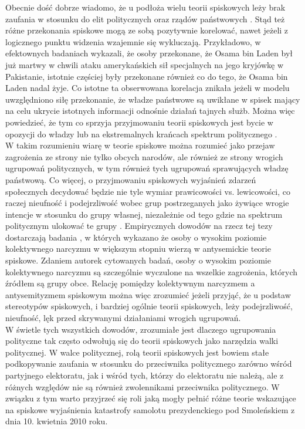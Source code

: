 \documentclass[man]{apa6}
\begin{document}
	Obecnie dość dobrze wiadomo, że u podłoża wielu teorii spiskowych leży brak zaufania w stosunku do elit politycznych oraz rządów państwowych \parencite[zob. przegląd w,][]{van2014power}. Stąd też różne przekonania spiskowe mogą ze sobą pozytywnie korelować, nawet jeżeli z logicznego punktu widzenia wzajemnie się wykluczają. Przykładowo, \textcite{wood2012dead} w efektownych badaniach wykazali, że osoby przekonane, że Osama bin Laden był już martwy w chwili ataku amerykańskich sił specjalnych na jego kryjówkę w Pakistanie, istotnie częściej były przekonane również co do tego, że Osama bin Laden nadal żyje. Co istotne ta obserwowana korelacja znikała jeżeli w modelu uwzględniono siłę przekonanie, że władze państwowe są uwikłane w spisek mający na celu ukrycie istotnych informacji odnośnie działań tajnych służb. Można więc powiedzieć, że tym co sprzyja przyjmowaniu teorii spiskowych jest bycie w opozycji do władzy lub na ekstremalnych krańcach spektrum politycznego \parencite[patrz, np.,][]{inglehart1987extremist}.\\
	W takim rozumieniu wiarę w teorie spiskowe można rozumieć jako przejaw zagrożenia ze strony nie tylko obcych narodów, ale również ze strony wrogich ugrupowań politycznych, w tym również tych ugrupowań sprawujących władzę państwową. Co więcej, o przyjmowaniu spiskowych wyjaśnień zdarzeń społecznych decydować będzie nie tyle wymiar prawicowości vs. lewicowości, co raczej nieufność i podejrzliwość wobec grup postrzeganych jako żywiące wrogie intencje w stosunku do grupy własnej, niezależnie od tego gdzie na spektrum politycznym ulokować te grupy \parencite{prooijen2015mutual}. Empirycznych dowodów na rzecz tej tezy dostarczają badania \textcite{golec2012collective}, w których wykazano że osoby o wysokim poziomie kolektywnego narcyzmu w większym stopniu wierzą w antysemickie teorie spiskowe. Zdaniem autorek cytowanych badań, osoby o wysokim poziomie kolektywnego narcyzmu są szczególnie wyczulone na wszelkie zagrożenia, których źródłem są grupy obce. Relację pomiędzy kolektywnym narcyzmem a antysemityzmem spiskowym można więc zrozumieć jeżeli przyjąć, że u podstaw stereotypów spiskowych, i bardziej ogólnie teorii spiskowych, leży podejrzliwość, nieufność, lęk przed skrywanymi działaniami wrogich ugrupowań.\\
	W świetle tych wszystkich dowodów, zrozumiałe jest dlaczego ugrupowania polityczne tak często odwołują się do teorii spiskowych jako narzędzia walki politycznej. W walce politycznej, rolą teorii spiskowych jest bowiem stałe podkopywanie zaufania w stosunku do przeciwnika politycznego zarówno wśród partyjnego elektoratu, jak i wśród tych, którzy do elektoratu nie należą, ale z różnych względów nie są również zwolennikami przeciwnika politycznego. W związku z tym warto przyjrzeć się roli jaką mogły pełnić różne teorie wskazujące na spiskowe wyjaśnienia katastrofy samolotu prezydenckiego pod Smoleńskiem z dnia 10. kwietnia 2010 roku.\\
\end{document}
